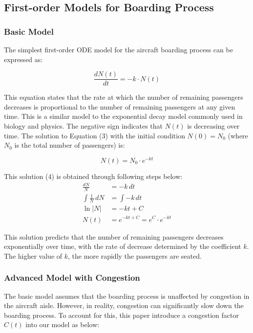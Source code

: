 \documentclass[12pt]{article}
\begin{document}
\subsection{First-order Models for Boarding Process}
\subsubsection{Basic Model}

The simplest first-order ODE model for the aircraft boarding process can be expressed as:

\begin{equation}
\frac{dN(t)}{dt} = -k \cdot N(t)
\end{equation}

This equation states that the rate at which the number of remaining passengers decreases is proportional to the number of remaining passengers at any given time. This is a similar model to the exponential decay model commonly used in biology and physics. The negative sign indicates that $N(t)$ is decreasing over time. The solution to Equation (3) with the initial condition $N(0) = N_0$ (where $N_0$ is the total number of passengers) is:

\begin{equation}
N(t) = N_0 \cdot e^{-kt}
\end{equation}

This solution (4) is obtained through following steps below:
\begin{align*}
\frac{dN}{N} &= -k\,dt \\
\int \frac{1}{N}\,dN &= \int -k\,dt \\
\ln|N| &= -kt + C \\
N(t) &= e^{-kt+C} = e^C \cdot e^{-kt}
\end{align*}

This solution predicts that the number of remaining passengers decreases exponentially over time, with the rate of decrease determined by the coefficient $k$. The higher value of $k$, the more rapidly the passengers are seated.

\subsubsection{Advanced Model with Congestion}

The basic model assumes that the boarding process is unaffected by congestion in the aircraft aisle. However, in reality, congestion can significantly slow down the boarding process. To account for this, this paper introduce a congestion factor $C(t)$ into our model as below:
\end{document}
